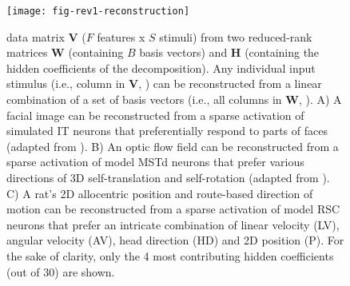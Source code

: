 \begin{figure}[!h]
	\centering
	\texttt{[image: fig-rev1-reconstruction]}
    \caption{ data matrix \textbf{V}
             ($F$ features x $S$ stimuli)
             from two reduced-rank matrices \textbf{W}
             (containing $B$ basis vectors) and \textbf{H}
             (containing the hidden coefficients of the decomposition).
             Any individual input stimulus (i.e., column in \textbf{V}, )
             can be reconstructed from a linear combination
             of a set of basis vectors (i.e., all columns in \textbf{W}, 
             ).
             A) A facial image can be reconstructed from a sparse activation
                of simulated \acs{IT} neurons that
                preferentially respond to parts of faces
                (adapted from \cite{LeeSeung1999}).
             B) An optic flow field can be reconstructed from a sparse
                activation of model \acs{MSTd} neurons that prefer various
                directions of 3D self-translation and self-rotation
                (adapted from \cite{Beyeler2016}).
             C) A rat's 2D allocentric position and route-based direction of
                motion can be reconstructed from a sparse activation of
                model \acs{RSC} neurons that prefer an intricate combination of
                linear velocity (LV), angular velocity (AV), head direction (HD)
                and 2D position (P).
                For the sake of clarity, only the 4 most contributing hidden
                coefficients (out of 30) are shown.}
	\label{fig:NMF|reconstruction}
\end{figure}


